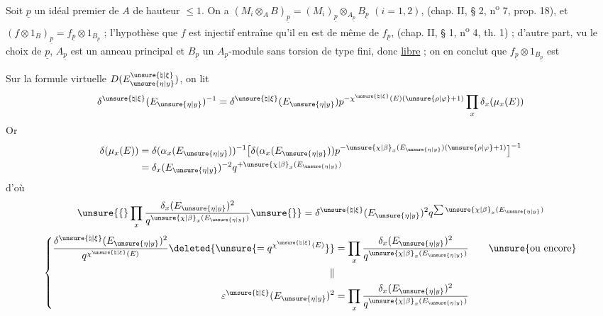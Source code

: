 Soit $\underline{p}$ un idéal premier de $A$ de hauteur $\le1$. On a $(M_i\otimes_A B)_{\underline{p}}=(M_i)_{\underline{p}}\otimes_{A_{\underline{p}}}B_{\underline{p}}$ $(i=1,2)$, (chap. II, § 2, n\textsuperscript{o} 7, prop. 18), et $(f\otimes1_B)_{\underline{p}}=f_{\underline{p}}\otimes1_{B_{\underline{p}}}$ ; l'hypothèse que $f$ est injectif entraîne qu'il en est de même de $f_{\underline{p}}$, (chap. II, § 1, n\textsuperscript{o} 4, th. 1) ; d'autre part, vu le choix de $\underline{p}$, $A_{\underline{p}}$ est un anneau principal et $B_{\underline{p}}$ un $A_{\underline{p}}$-module sans torsion de type fini, donc \uline{libre} ; on en conclut que $f_{\underline{p}}\otimes1_{B_{\underline{p}}}$ est

Sur la formule virtuelle  $D(E_{\unsure{\eta|y}}^{\unsure{\natural|\xi}})$, on lit
\[
\delta^{\unsure{\natural|\xi}}(E_{\unsure{\eta|y}})^{-1}=\delta^{\unsure{\natural|\xi}}(E_{\unsure{\eta|y}})p^{-\chi^{\unsure{\natural|\xi}}(E)(\unsure{\rho|\varphi}+1)}\prod_x\delta_x(\mu_x(E))
\]
Or
\[
\begin{aligned}
\delta(\mu_x(E))&=\delta(\alpha_x(E_{\unsure{\eta|y}}))^{-1}\bigl[\delta(\alpha_x(E_{\unsure{\eta|y}}))p^{-\unsure{\chi|\beta}_x(E_{\unsure{\eta|y}})(\unsure{\rho|\varphi}+1)}\bigr]^{-1}\\
&=\delta_x(E_{\unsure{\eta|y}})^{-2}q^{+\unsure{\chi|\beta}_x(E_{\unsure{\eta|y}})}
\end{aligned}
\]
d'où
\[
\unsure{\{}\prod_x\frac{\delta_x(E_{\unsure{\eta|y}})^2}{q^{\unsure{\chi|\beta}_x(E_{\unsure{\eta|y}})}}\unsure{\}}=\delta^{\unsure{\natural|\xi}}(E_{\unsure{\eta|y}})^2q^{\sum\unsure{\chi|\beta}_x(E_{\unsure{\eta|y}})}
\]
\[
\left\{\begin{aligned}
\frac{\delta^{\unsure{\natural|\xi}}(E_{\unsure{\eta|y}})^2}{q^{\chi^{\unsure{\natural|\xi}}(E)}}\deleted{\unsure{=q^{\chi^{\unsure{\natural|\xi}}(E)}}}&=\prod_x\frac{\delta_x(E_{\unsure{\eta|y}})^2}{q^{\unsure{\chi|\beta}_x(E_{\unsure{\eta|y}})}}\qquad\text{\unsure{ou encore}}\\
\Vert&\\
\varepsilon^{\unsure{\natural|\xi}}(E_{\unsure{\eta|y}})^2&=\prod_x\frac{\delta_x(E_{\unsure{\eta|y}})^2}{q^{\unsure{\chi|\beta}_x(E_{\unsure{\eta|y}})}}
\end{aligned}\right.
\]

